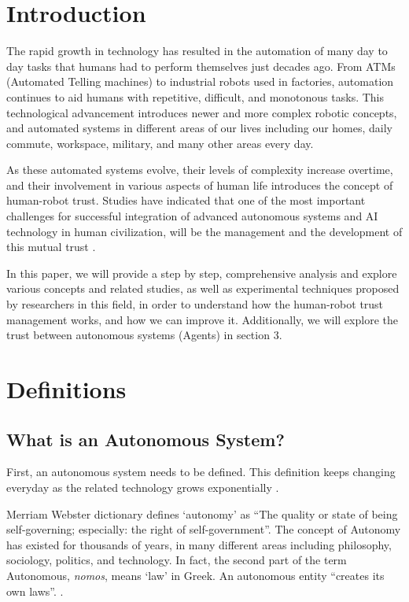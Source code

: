 \documentclass[runningheads,a4paper]{llncs}
\begin{document}

\section{Introduction} 
\label{ShervinTrustSurvey_introduction}
The rapid growth in technology has resulted in the automation of many day to day tasks that humans had to perform themselves just decades ago. From ATMs (Automated Telling machines) to industrial robots used in factories, automation continues to aid humans with repetitive, difficult, and monotonous tasks. This technological advancement introduces newer and more complex robotic concepts, and automated systems in different areas of our lives including our homes, daily commute, workspace, military, and many other areas every day.

As these automated systems evolve, their levels of complexity increase overtime, and their involvement in various aspects of human life introduces the concept of human-robot trust. Studies have indicated that one of the most important challenges for successful integration of advanced autonomous systems and AI technology in human civilization, will be the management and the development of this mutual trust \cite{beer2014toward}.

In this paper, we will provide a step by step, comprehensive analysis and explore various concepts and related studies, as well as experimental techniques proposed by researchers in this field, in order to understand how the human-robot trust management works, and how we can improve it. Additionally, we will explore the trust between autonomous systems (Agents) in section 3.

\section{Definitions}
\subsection{What is an Autonomous System?}
First, an autonomous system needs to be defined. This definition keeps changing everyday as the related technology grows exponentially \cite{schaefer2013perception}.

Merriam Webster dictionary defines `autonomy' as  ``The quality or state of being self-governing; especially: the right of self-government''. The concept of Autonomy has existed for thousands of years, in many different areas including philosophy, sociology, politics, and technology. In fact, the second part of the term Autonomous, \textsl{nomos}, means `law' in  Greek. An autonomous entity ``creates its own laws''. \cite{MerriamWebsterAtn}. 
\end{document}
